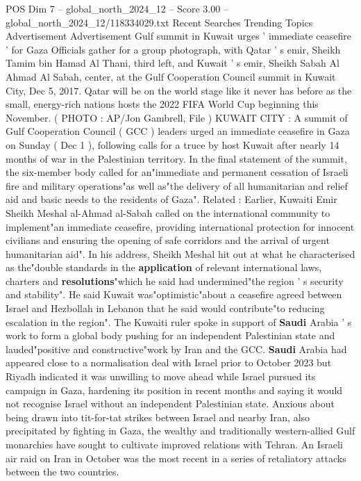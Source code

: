 \begin{textsample}{POS Dim 7 – global\_north\_2024\_12 – Score 3.00 – global\_north\_2024\_12/118334029.txt}  \label{ex:f7_pos_293}
Recent Searches Trending Topics Advertisement Advertisement Gulf summit in Kuwait urges ' immediate ceasefire ' for Gaza Officials gather for a group photograph, with Qatar ' s emir, Sheikh Tamim bin Hamad Al Thani, third left, and Kuwait ' s emir, Sheikh Sabah Al Ahmad Al Sabah, center, at the Gulf Cooperation Council summit in Kuwait City, Dec 5, 2017.
Qatar will be on the world stage like it never has before as the small, energy-rich nations hosts the 2022 FIFA World Cup beginning this November. ( PHOTO : AP/Jon Gambrell, File ) KUWAIT CITY : A summit of Gulf Cooperation Council ( GCC ) leaders urged an immediate ceasefire in Gaza on Sunday ( Dec 1 ), following calls for a truce by host Kuwait after nearly 14 months of war in the Palestinian territory.
In the final statement of the summit, the six-member body called for an"immediate and permanent cessation of Israeli fire and military operations"as well as"the delivery of all humanitarian and relief aid and basic needs to the residents of Gaza".
Related : Earlier, Kuwaiti Emir Sheikh Meshal al-Ahmad al-Sabah called on the international community to implement"an immediate ceasefire, providing international protection for innocent civilians and ensuring the opening of safe corridors and the arrival of urgent humanitarian aid".
In his address, Sheikh Meshal hit out at what he characterised as the"double standards in the \textbf{application} of relevant international laws, charters and \textbf{resolutions}"which he said had undermined"the region ' s security and stability".
He said Kuwait was"optimistic"about a ceasefire agreed between Israel and Hezbollah in Lebanon that he said would contribute"to reducing escalation in the region".
The Kuwaiti ruler spoke in support of \textbf{Saudi} Arabia ' s work to form a global body pushing for an independent Palestinian state and lauded"positive and constructive"work by Iran and the GCC. \textbf{Saudi} Arabia had appeared close to a normalisation deal with Israel prior to October 2023 but Riyadh indicated it was unwilling to move ahead while Israel pursued its campaign in Gaza, hardening its position in recent months and saying it would not recognise Israel without an independent Palestinian state.
Anxious about being drawn into tit-for-tat strikes between Israel and nearby Iran, also precipitated by fighting in Gaza, the wealthy and traditionally western-allied Gulf monarchies have sought to cultivate improved relations with Tehran.
An Israeli air raid on Iran in October was the most recent in a series of retaliatory attacks between the two countries.

\end{textsample}
